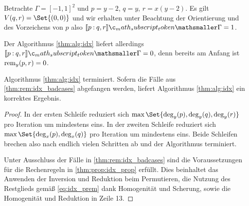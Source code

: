 \documentclass{mythesis}
\begin{document}
\begin{example} \label{thm:ex:idx_nullext}
    Betrachte $\Gamma = [-1,1]^2$ und $p = y - 2$, $q = y$, $r = x(y - 2)$.
    Es gilt $V(q,r) = \Set{(0,0)}$ und wir erhalten unter Beachtung der Orientierung und des Vorzeichens von $p$ also $\Index{\Gamma}{p}{q,r} = 1$.

    Der Algorithmus \ref{thm:alg:idx} liefert allerdings $\Index{\Gamma}{p}{q,r} = 0$, denn bereits am Anfang ist $\operatorname{rem}_y(p,r) = 0$.
\end{example}

\begin{proposition}
    Algorithmus \ref{thm:alg:idx} terminiert.
    Sofern die Fälle aus \ref{thm:rem:idx_badcases} abgefangen werden, liefert Algorithmus \ref{thm:alg:idx} ein korrektes Ergebnis.
    \begin{proof}
        In der ersten Schleife reduziert sich $\max\Set{\deg_y(p), \deg_y(q), \deg_y(r)}$ pro Iteration um mindestens eins.
        In der zweiten Schleife reduziert sich $\max\Set{\deg_x(p), \deg_x(q)}$ pro Iteration um mindestens eins.
        Beide Schleifen brechen also nach endlich vielen Schritten ab und der Algorithmus terminiert.

        Unter Ausschluss der Fälle in \ref{thm:rem:idx_badcases} sind die Voraussetzungen für die Rechenregeln in \ref{thm:prop:idx_prop} erfüllt.
        Dies beinhaltet das Anwenden der Inversion und Reduktion beim Permutieren, die Nutzung des Restglieds gemäß \eqref{eq:idx_prem} dank Homogenität und Scherung, sowie die Homogenität und Reduktion in Zeile 13.
    \end{proof}
\end{proposition}
\end{document}

